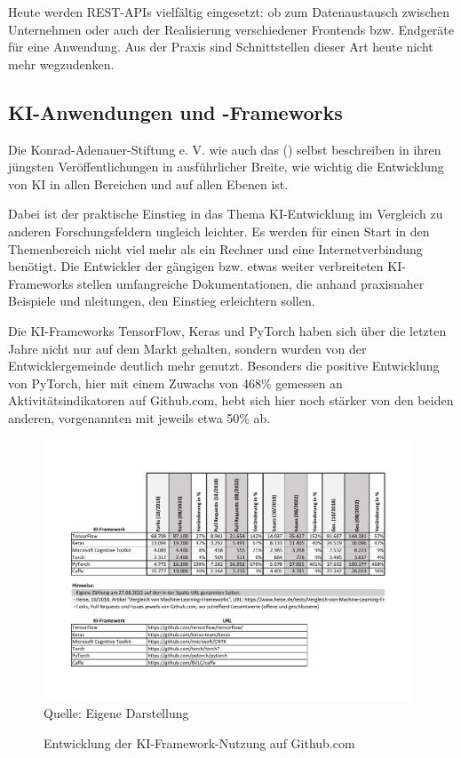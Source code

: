 \documentclass[12pt,oneside,titlepage,listof=totoc,bibliography=totoc]{scrartcl}
\begin{document}
Heute werden REST-APIs vielfältig eingesetzt: ob zum Datenaustausch zwischen Unternehmen oder auch der Realisierung verschiedener Frontends bzw. Endgeräte für eine Anwendung. Aus der Praxis sind Schnittstellen dieser Art heute nicht mehr wegzudenken. 

\subsection{KI-Anwendungen und -Frameworks}

Die Konrad-Adenauer-Stiftung e. V. \parencite{52-wangermann2020ki} wie auch das \citeauthor[]{53-ki-strat} (\citeyear[]{53-ki-strat}) selbst beschreiben in ihren jüngsten Veröffentlichungen in ausführlicher Breite, wie wichtig die Entwicklung von KI in allen Bereichen und auf allen Ebenen ist.

Dabei ist der praktische Einstieg in das Thema KI-Entwicklung im Vergleich zu anderen Forschungsfeldern ungleich  leichter. Es werden für einen Start in den Themenbereich nicht viel mehr als ein Rechner und eine Internetverbindung benötigt. Die Entwickler der gängigen bzw. etwas weiter verbreiteten KI-Frameworks stellen umfangreiche Dokumentationen,  die anhand praxisnaher Beispiele und nleitungen, den Einstieg erleichtern sollen. 

Die KI-Frameworks TensorFlow, Keras und PyTorch haben sich über die letzten Jahre nicht nur auf dem Markt gehalten, sondern wurden von der Entwicklergemeinde deutlich mehr genutzt. Besonders die positive Entwicklung von PyTorch, hier mit einem Zuwachs von \mbox{468\space\%} gemessen an Aktivitätsindikatoren auf Github.com, hebt sich hier noch stärker von den beiden anderen, vorgenannten mit jeweils etwa \mbox{50\space\%} ab. 

\begin{figure}[H]
	\caption{Entwicklung der KI-Framework-Nutzung auf Github.com}\label{fig:ki-framework-nutzung}
	\includegraphics[width=0.98\textwidth]{ki-framework-nutzung.pdf}
	\\
	Quelle: Eigene Darstellung
\end{figure}
\end{document}
